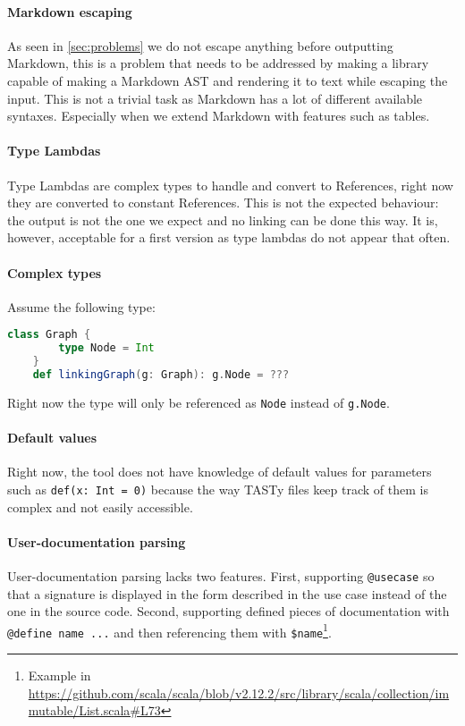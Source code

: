 \documentclass{report}
\begin{document}
\paragraph{Markdown escaping}
As seen in \autoref{sec:problems} we do not escape anything before outputting Markdown, this is a problem that needs to be addressed by making a library capable of making a Markdown AST and rendering it to text while escaping the input. This is not a trivial task as Markdown has a lot of different available syntaxes. Especially when we extend Markdown with features such as tables.

\paragraph{Type Lambdas}
Type Lambdas are complex types to handle and convert to References, right now they are converted to constant References. This is not the expected behaviour: the output is not the one we expect and no linking can be done this way. It is, however, acceptable for a first version as type lambdas do not appear that often.

\paragraph{Complex types}
Assume the following type:
\begin{lstlisting}[language=scala]
    class Graph {
        type Node = Int
    }
    def linkingGraph(g: Graph): g.Node = ???    
\end{lstlisting}
Right now the type will only be referenced as \texttt{Node} instead of \texttt{g.Node}.

\paragraph{Default values}
Right now, the tool does not have knowledge of default values for parameters such as \texttt{def(x: Int = 0)} because the way TASTy files keep track of them is complex and not easily accessible.

\paragraph{User-documentation parsing}
User-documentation parsing lacks two features. First, supporting \texttt{@usecase} so that a signature is displayed in the form described in the use case instead of the one in the source code. Second, supporting defined pieces of documentation with \texttt{@define name ...} and then referencing them with \texttt{\$name}\footnote{Example in \url{https://github.com/scala/scala/blob/v2.12.2/src/library/scala/collection/immutable/List.scala\#L73}}.
\end{document}
